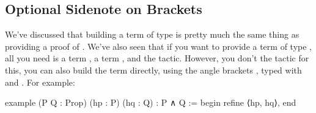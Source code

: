 \documentclass[letterpaper,10pt,english]{sphinxmanual}
\begin{document}
\begin{sphinxVerbatim}[commandchars=\\\{\}]
                

             

             
\end{sphinxVerbatim}


\subsection{Optional Sidenote on Brackets}
\label{\detokenize{day1:optional-sidenote-on-brackets}}
\sphinxAtStartPar
We’ve discussed that building a term of type  is pretty much the same thing as providing a proof of .
We’ve also seen that if you want to provide a term of type , all you need is a term , a term , and the  tactic.
However, you don’t  the  tactic for this, you can also build the term directly, using the angle brackets , typed with  and .
For example:

\begin{sphinxVerbatim}[commandchars=\\\{\}]
example (P Q : Prop) (hp : P) (hq : Q) : P ∧ Q :=
begin
  refine ⟨hp, hq⟩,
end
\end{sphinxVerbatim}
\end{document}
